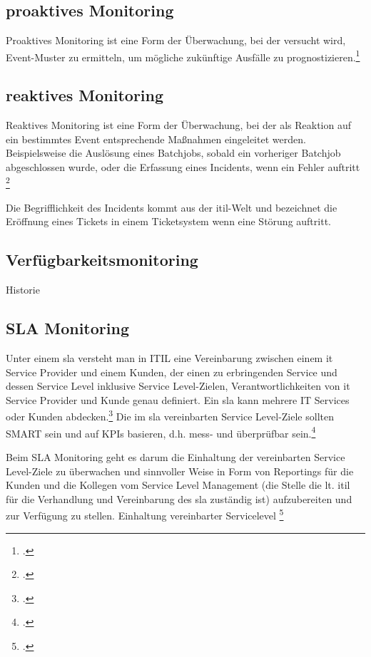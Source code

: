 \documentclass[12pt,a4paper,parskip]{scrreprt}
\begin{document}
	\subsection{proaktives Monitoring}
	\glqq Proaktives Monitoring ist eine Form der Überwachung, bei der versucht wird, Event-Muster zu ermitteln, um mögliche zukünftige Ausfälle zu prognostizieren.\grqq \footcite[S. 511]{ebelitilv3}
	\subsection{reaktives Monitoring}
	\glqq Reaktives Monitoring ist eine Form der Überwachung, bei der als Reaktion auf ein bestimmtes Event entsprechende Maßnahmen eingeleitet werden. Beispielsweise die Auslösung eines Batchjobs, sobald ein vorheriger Batchjob abgeschlossen wurde, oder die Erfassung eines Incidents, wenn ein Fehler auftritt\grqq
	\footcite[S. 511]{ebelitilv3}
	
	Die Begrifflichkeit des Incidents kommt aus der \acrshort{itil}-Welt und bezeichnet die Eröffnung eines Tickets in einem Ticketsystem wenn eine Störung auftritt. 
	\subsection{Verfügbarkeitsmonitoring}
	Historie
	\subsection{SLA Monitoring}
	Unter einem \acrfull{sla} versteht man in ITIL eine \glqq Vereinbarung zwischen einem \acrshort{it} Service Provider und einem Kunden, der einen zu erbringenden Service und dessen Service Level inklusive Service Level-Zielen, Verantwortlichkeiten von \acrshort{it} Service Provider und Kunde genau definiert. Ein \acrshort{sla} kann mehrere IT Services oder Kunden abdecken.\grqq \footcite[S. 732; Stichwort: Service Level Agreement]{ebelitilv3} Die im \acrshort{sla} vereinbarten Service Level-Ziele sollten SMART sein und auf KPIs basieren, d.h. mess- und überprüfbar sein.\footcite[S. 733; Stichwort: Service Level-Ziele]{ebelitilv3}
	
	Beim SLA Monitoring geht es darum die Einhaltung der vereinbarten Service Level-Ziele zu überwachen und sinnvoller Weise in Form von Reportings für die Kunden und die Kollegen vom Service Level Management (die Stelle die lt. \acrshort{itil} für die Verhandlung und Vereinbarung des \acrshort{sla} zuständig ist) aufzubereiten und zur Verfügung zu stellen.
	Einhaltung vereinbarter Servicelevel \footcite[40]{iso20000sla}
\end{document}
